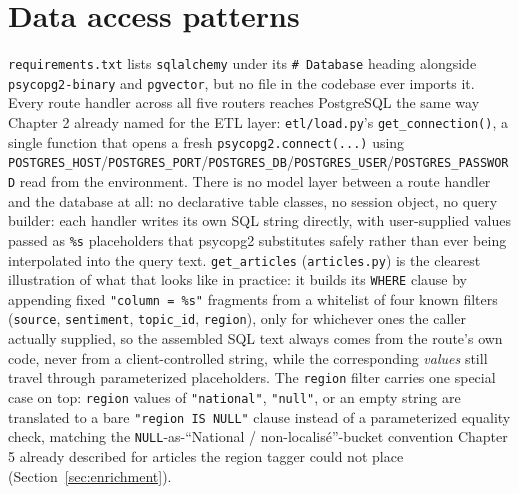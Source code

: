 \section{Data access patterns}
\label{sec:data-access}
\begin{sloppypar}
\texttt{requirements.txt} lists \texttt{sqlalchemy} under its \texttt{\# Database} heading alongside \texttt{psycopg2-binary} and \texttt{pgvector}, but no file in the codebase ever imports it. Every route handler across all five routers reaches PostgreSQL the same way Chapter 2 already named for the ETL layer: \texttt{etl/\allowbreak load.py}'s \texttt{get\_connection()}, a single function that opens a fresh \texttt{psycopg2.connect(...)} using \texttt{POSTGRES\_HOST}/\texttt{POSTGRES\_PORT}/\texttt{POSTGRES\_DB}/\texttt{POSTGRES\_USER}/\texttt{POSTGRES\_PASSWORD} read from the environment. There is no model layer between a route handler and the database at all: no declarative table classes, no session object, no query builder: each handler writes its own SQL string directly, with user-supplied values passed as \texttt{\%s} placeholders that psycopg2 substitutes safely rather than ever being interpolated into the query text. \texttt{get\_articles} (\texttt{articles.py}) is the clearest illustration of what that looks like in practice: it builds its \texttt{WHERE} clause by appending fixed \texttt{"column = \%s"} fragments from a whitelist of four known filters (\texttt{source}, \texttt{sentiment}, \texttt{topic\_id}, \texttt{region}), only for whichever ones the caller actually supplied, so the assembled SQL text always comes from the route's own code, never from a client-controlled string, while the corresponding \emph{values} still travel through parameterized placeholders. The \texttt{region} filter carries one special case on top: \texttt{region} values of \texttt{"national"}, \texttt{"null"}, or an empty string are translated to a bare \texttt{"region IS NULL"} clause instead of a parameterized equality check, matching the \texttt{NULL}-as-``National / non-localisé''-bucket convention Chapter 5 already described for articles the region tagger could not place (Section~\ref{sec:enrichment}).
\end{sloppypar}

